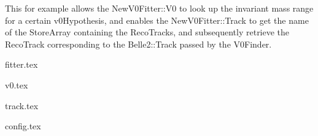 This for example allows the NewV0Fitter::V0 to look up the invariant mass range for a certain v0Hypothesis, and enables the NewV0Fitter::Track to get the name of the StoreArray containing the RecoTracks, and subsequently retrieve the RecoTrack corresponding to the Belle2::Track passed by the V0Finder.


\begin{lstbox}{%
    \label{code:refactor-fitter}
  }
  {fitter.tex}
\end{lstbox}

\begin{lstbox}{%
    \label{code:refactor-v0}
  }
  {v0.tex}
\end{lstbox}

\begin{lstbox}{%
    \label{code:refactor-track}
  }
  {track.tex}
\end{lstbox}

\begin{lstbox}{%
    \label{code:refactor-config}
  }
  {config.tex}
\end{lstbox}

